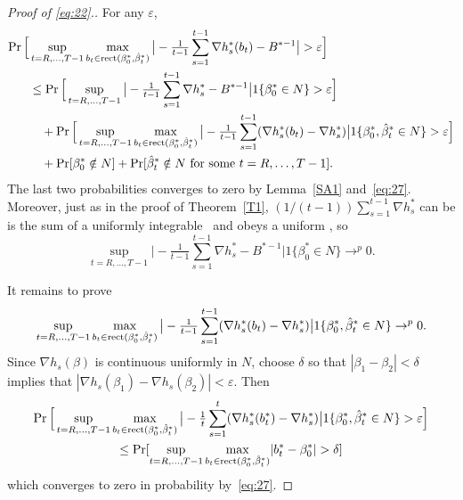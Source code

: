 \documentclass[12pt,fleqn]{article}
\begin{document}
\begin{proof}[Proof of \eqref{eq:22}.]
For any $\varepsilon$,
\begin{align*}\label{eq:18}
  \operatorname{Pr}\Big[&\sup_{t = R,\dots,T-1} \max_{b_t \in \operatorname{rect}(\beta_0^*, \hat \beta_t^*)}
  \big\lvert - \tfrac{1}{t-1} \sum_{s=1}^{t-1}
  \nabla h_s^*(b_t) - B^{*-1} \big\rvert > \varepsilon \Big] \\
  &\leq \operatorname{Pr}\Big[\sup_{t=R,\dots,T-1}
  \big\lvert - \tfrac{1}{t-1} \sum_{s=1}^{t-1} \nabla h_s^* - B^{*-1} \big\rvert
  1\{\beta_0^* \in N\}> \varepsilon \Big] \\
  &\quad + \operatorname{Pr}\Big[\sup_{t=R,\dots,T-1} \max_{b_t \in \operatorname{rect}(\beta_0^*, \hat \beta_t^*)}
  \big\lvert - \tfrac{1}{t-1} \sum_{s=1}^{t-1} (\nabla h_s^*(b_t) - \nabla h_s^*)
  \big\rvert 1\{\beta_0^*, \hat \beta_t^* \in N\} > \varepsilon \Big] \\
  &\quad + \operatorname{Pr}[\beta_0^* \notin N]
  + \operatorname{Pr}[\hat \beta_t^* \notin N \text{\ for some\ } t = R,\dots,T-1].
\end{align*}
The last two probabilities converges to zero by Lemma~\ref{SA1}
and~\eqref{eq:27}.  Moreover, just as in the proof of
Theorem~\ref{T1}, $(1/(t-1)) \sum_{s=1}^{t-1} \nabla h_s^*$ can be is
the sum of a uniformly integrable \mds\ and obeys a uniform \lln, so
\begin{equation*}
  \sup_{t=R,\dots,T-1}
  \big\lvert - \tfrac{1}{t-1} \sum_{s=1}^{t-1} \nabla h_s^* - B^{*-1} \big\rvert
  1\{\beta_0^* \in N\} \to^p 0.
\end{equation*}

It remains to prove
\begin{equation}\label{eq:31}
  \sup_{t=R,\dots,T-1} \max_{b_t \in \operatorname{rect}(\beta_0^*, \hat \beta_t^*)}
  \big\lvert - \tfrac{1}{t-1} \sum_{s=1}^{t-1} (\nabla h_s^*(b_t) - \nabla h_s^*)
  \big\rvert 1\{\beta_0^*, \hat \beta_t^* \in N\} \to^p 0.
\end{equation}
Since $\nabla h_s(\beta)$ is continuous uniformly in $N$, choose
$\delta$ so that $|\beta_1 - \beta_2| < \delta$ implies that
$|\nabla h_s(\beta_1) - \nabla h_s(\beta_2)| < \varepsilon$. Then
\begin{multline*}
  \operatorname{Pr}\Big[\sup_{t=R,\dots,T-1} \max_{b_t \in \operatorname{rect}(\beta_0^*, \hat \beta_t^*)}
  \big\lvert - \tfrac{1}{t} \sum_{s=1}^t
  (\nabla h_s^*(b_t^*) - \nabla h_s^*) \big\rvert 1\{\beta_0^*, \hat \beta_t^* \in N\}
  > \varepsilon \Big]
  \\ \leq \operatorname{Pr}[\sup_{t=R,\dots,T-1} \max_{b_t \in \operatorname{rect}(\beta_0^*, \hat \beta_t^*)}
  \lvert b_t^* - \beta_0^* \rvert > \delta]
\end{multline*}
which converges to zero in probability by~\eqref{eq:27}.
\end{proof}
\end{document}
